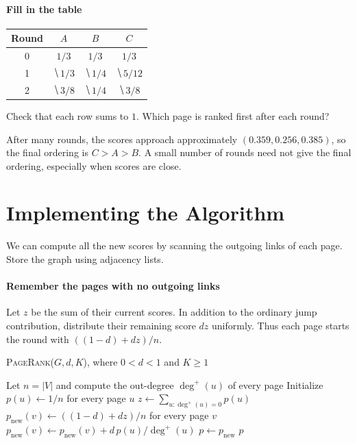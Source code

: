 \documentclass[11pt]{article}
\begin{document}
\paragraph{Fill in the table}
\begin{center}
\renewcommand{\arraystretch}{1.7}
\begin{tabular}{c|ccc}
Round & $A$ & $B$ & $C$\\\hline
0 & $1/3$ & $1/3$ & $1/3$\\
1 & $\hide{1/3}$ & $\hide{1/4}$ & $\hide{5/12}$\\
2 & $\hide{3/8}$ & $\hide{1/4}$ & $\hide{3/8}$
\end{tabular}
\end{center}
Check that each row sums to $1$. Which page is ranked first after each round?
\vs{.6cm}

\vfill
After many rounds, the scores approach approximately $(0.359,0.256,0.385)$,
so the final ordering is $C>A>B$. A small number of rounds need not give
the final ordering, especially when scores are close.

\newpage
\section{Implementing the Algorithm}
We can compute all the new scores by scanning the outgoing links of each
page. Store the graph using adjacency lists.

\paragraph{Remember the pages with no outgoing links}
Let $z$ be the sum of their current scores. In addition to the ordinary jump
contribution, distribute their remaining score $dz$ uniformly. Thus each
page starts the round with $((1-d)+dz)/n$.

\begin{algorithm}[h]
    \textsc{PageRank}($G,d,K$), where $0<d<1$ and $K\geq1$
    \begin{algorithmic}
        \State Let $n=|V|$ and compute the out-degree $\deg^+(u)$ of every page
        \State Initialize $p(u)\gets1/n$ for every page $u$
            \State $z\gets\sum_{u:\deg^+(u)=0}p(u)$
            \State $p_{\mathrm{new}}(v)\gets((1-d)+dz)/n$ for every page $v$
                \State $p_{\mathrm{new}}(v)\gets p_{\mathrm{new}}(v)+d\,p(u)/\deg^+(u)$
            \EndFor
            \State $p\gets p_{\mathrm{new}}$
        \EndFor
        \State \Return $p$
    \end{algorithmic}
\end{algorithm}
\end{document}
